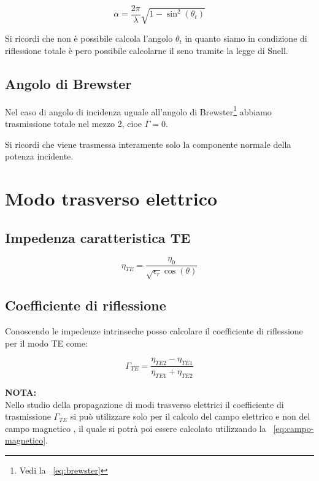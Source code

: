 		\begin{equation}
		\alpha= \frac{2 \pi}{\lambda}\sqrt{1-\sin^2(\theta_t)}
		\end{equation}
		
		Si ricordi che non è possibile calcola l'angolo $\theta_t$ in quanto siamo in condizione di riflessione totale è pero possibile calcolarne il seno tramite la legge di Snell.


		\subsection{Angolo di Brewster}

			Nel caso di angolo di incidenza uguale all'angolo di Brewster\footnote{Vedi la ~\ref{eq:brewster}} abbiamo trasmissione totale nel mezzo 2, cioe $\Gamma=0$.

			Si ricordi che viene trasmessa interamente solo la componente normale della potenza incidente.

	\section{Modo trasverso elettrico}

		\subsection{Impedenza caratteristica TE}
			\begin{equation}
			\eta_{TE}=\frac{\eta_0}{\sqrt{\epsilon_r}\cos(\theta)}
			\end{equation}

		\subsection{Coefficiente di riflessione}
			Conoscendo le impedenze intrinseche posso calcolare il coefficiente di riflessione per il modo TE come:

			\begin{equation}
			\Gamma_{TE}=\frac{\eta_{TE2}-\eta_{TE1}}{\eta_{TE1}+\eta_{TE2}}
			\end{equation}

			 \textbf{NOTA:}
			 \\ 
			 Nello studio della propagazione di modi trasverso elettrici il coefficiente di trasmissione $\Gamma_{TE}$ si può utilizzare solo per il calcolo del campo elettrico e non del campo magnetico , il quale si potrà poi essere calcolato utilizzando la ~\ref{eq:campo-magnetico}.

